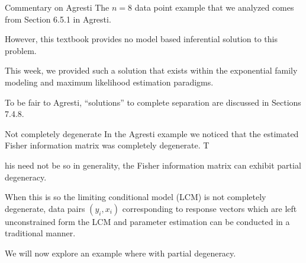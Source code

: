 \documentclass[
  ignorenonframetext,
]{beamer}
\begin{document}
\begin{frame}{Commentary on Agresti}
\protect\hypertarget{commentary-on-agresti}{}
The \(n = 8\) data point example that we analyzed comes from Section
6.5.1 in Agresti.

\vspace{12pt}

However, this textbook provides no model based inferential solution to
this problem.

\vspace{12pt}

This week, we provided such a solution that exists within the
exponential family modeling and maximum likelihood estimation paradigms.

\vspace{12pt}

To be fair to Agresti, ``solutions'' to complete separation are
discussed in Sections 7.4.8.
\end{frame}

\begin{frame}{Not completely degenerate}
\protect\hypertarget{not-completely-degenerate}{}
In the Agresti example we noticed that the estimated Fisher information
matrix was completely degenerate. T

\vspace{12pt}

his need not be so in generality, the Fisher information matrix can
exhibit partial degeneracy.

\vspace{12pt}

When this is so the limiting conditional model (LCM) is not completely
degenerate, data pairs \((y_i,x_i)\) corresponding to response vectors
which are left unconstrained form the LCM and parameter estimation can
be conducted in a traditional manner.

\vspace{12pt}

We will now explore an example where with partial degeneracy.
\end{frame}
\end{document}
